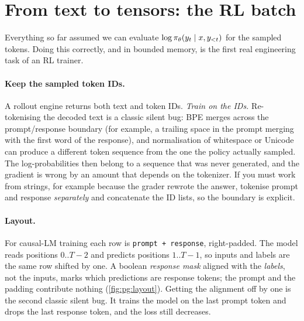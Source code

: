 \section{From text to tensors: the RL batch}\label{sec:pg:batch}

Everything so far assumed we can evaluate $\log\pi_\theta(y_t\mid x,y_{<t})$ for the sampled
tokens. Doing this correctly, and in bounded memory, is the first real engineering task of an
RL trainer.

\paragraph{Keep the sampled token IDs.} A rollout engine returns both text and token IDs.
\emph{Train on the IDs.} Re-tokenising the decoded text is a classic silent bug: BPE merges
across the prompt/response boundary (for example, a trailing space in the prompt merging with
the first word of the response), and normalisation of whitespace or Unicode can produce a
different token sequence from the one the policy actually sampled. The log-probabilities then
belong to a sequence that was never generated, and the gradient is wrong by an amount that
depends on the tokenizer. If you must work from strings, for example because the grader
rewrote the answer, tokenise prompt and response \emph{separately} and concatenate the ID
lists, so the boundary is explicit.

\paragraph{Layout.} For causal-LM training each row is \texttt{prompt + response}, right-padded.
The model reads positions $0..T-2$ and predicts positions $1..T-1$, so inputs and labels
are the same row shifted by one. A boolean \emph{response mask} aligned with the
\emph{labels}, not the inputs, marks which predictions are response tokens; the prompt and
the padding contribute nothing (\cref{fig:pg:layout}). Getting the alignment off by one is the
second classic silent bug. It trains the model on the last prompt token and drops the last
response token, and the loss still decreases.

